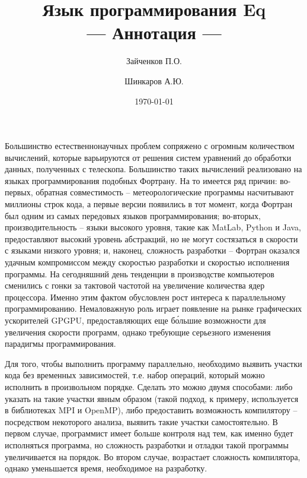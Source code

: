 \documentclass[a4paper]{llncs}
\author{Зайченков П.О.\inst{1} \and Шинкаров А.Ю.\inst{2}}
\date{\today}
\title{Язык программирования Eq \\
      --- Аннотация ---}
\institute{
  Московский физико-технический институт,
  Кафедра информатики и вычислительной техники
\and
  University of Hertfordshire,
  Hatfield, Hertfordshire,
  AL10 9AB, United Kingdom
}
\begin{document}
\maketitle

Большинство естественнонаучных проблем сопряжено с огромным
количеством вычислений, которые варьируются от решения систем
уравнений до обработки данных, полученных с телескопа.  Большинство
таких вычислений реализовано на языках программирования подобных
Фортрану.  На то имеется ряд причин: во-первых, обратная совместимость
-- метеорологические программы насчитывают миллионы строк кода, а
первые версии появились в тот момент, когда Фортран был одним из самых
передовых языков программирования; во-вторых, производительность --
языки высокого уровня, такие как MatLab, Python и Java, предоставляют
высокий уровень абстракций, но не могут состязаться в скорости с
языками низкого уровня; и, наконец, сложность разработки -- Фортран
оказался удачным компромиссом между скоростью разработки и скоростью
исполнения программы.  На сегодняшний день тенденции в производстве
компьютеров сменились с гонки за тактовой частотой на увеличение
количества ядер процессора.  Именно этим фактом обусловлен рост
интереса к параллельному программированию.  Немаловажную роль играет
появление на рынке графических ускорителей GPGPU, предоставляющих еще
б\'{о}льшие возможности для увеличения скорости программ, однако
требующие серьезного изменения парадигмы программирования.  

Для того, чтобы выполнить программу параллельно, необходимо выявить
участки кода без временных зависимостей, т.е. набор операций, который
можно исполнить в произвольном порядке.  Сделать это можно двумя
способами: либо указать на такие участки явным образом (такой подход,
к примеру, используется в библиотеках MPI и OpenMP), либо предоставить
возможность компилятору -- посредством некоторого анализа, выявить
такие участки самостоятельно.  В первом случае, программист имеет
больше контроля над тем, как именно будет исполняться программа, но
сложность разработки и отладки такой программы увеличивается на
порядок.  Во втором случае, возрастает сложность компилятора, однако
уменьшается время, необходимое на разработку.  
\end{document}
